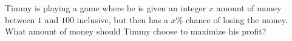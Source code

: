 Timmy is playing a game where he is given an integer $x$ amount of money between $1$ and $100$ inclusive, but then has a $x\%$ chance of losing the money. What amount of money should Timmy choose to maximize his profit?
